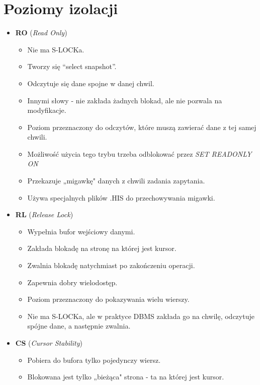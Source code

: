\documentclass[a4paper,twoside]{article}
\begin{document}
  \section*{Poziomy izolacji}
      \begin{itemize}
          \item \textbf{RO} (\emph{Read Only})
          \begin{itemize}
              \item Nie ma S-LOCKa.
              \item Tworzy się “select snapshot”.
              \item Odczytuje się dane spojne w danej chwil.
              \item Innymi słowy - nie zakłada żadnych blokad, ale nie pozwala na modyfikacje.
              \item Poziom przeznaczony do odczytów, które muszą zawierać dane z tej samej chwili.
              \item Możliwość użycia tego trybu trzeba odblokować przez \emph{SET READONLY ON}
              \item Przekazuje „migawkę" danych z chwili zadania zapytania.
              \item Używa specjalnych plików .HIS do przechowywania migawki.
          \end{itemize}
          \item \textbf{RL} (\emph{Release Lock})
          \begin{itemize}
              \item Wypełnia bufor wejściowy danymi.
              \item Zakłada blokadę na stronę na której jest kursor.
              \item Zwalnia blokadę natychmiast po zakończeniu operacji.
              \item Zapewnia dobry wielodostęp.
              \item Poziom przeznaczony do pokazywania wielu wierszy.
              \item Nie ma S-LOCKa, ale w praktyce DBMS zakłada go na chwilę, odczytuje spójne dane, a następnie zwalnia.
          \end{itemize}
          \item \textbf{CS} (\emph{Cursor Stability})
          \begin{itemize}
              \item Pobiera do bufora tylko pojedynczy wiersz.
              \item Blokowana jest tylko „bieżąca" strona - ta na której jest kursor.

\end{itemize}
\end{itemize}
\end{document}
